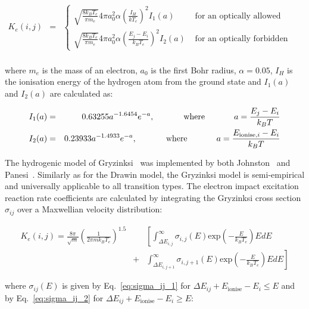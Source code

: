 \begin{eqnarray}
 K_e (i,j) &=& \left \lbrace \begin{array}{cc} \sqrt{ \frac{8 k_B T_e}{\pi m_e} } 4 \pi a_0^2 \alpha \left ( \frac{I_H}{k T_e} \right )^2 I_1 (a ) & \text{ for an optically allowed transition } \\ \sqrt{ \frac{8 k_B T_e}{\pi m_e} } 4 \pi a_0^2 \alpha \left ( \frac{E_j - E_i}{k_B T_e} \right )^2 I_2 (a ) & \text{ for an optically forbidden transition } \end{array} \right . \nonumber \\
 \label{eq:drawin_rates}
\end{eqnarray}
 
\noindent where $m_{e}$ is the mass of an electron, $a_{0}$ is the first Bohr radius, $\alpha = 0.05$, $I_H$ is the ionisation energy of the hydrogen atom from the ground state and $I_{1}(a)$ and $I_{2}(a)$ are calculated as:

\begin{eqnarray}
 I_1(a) &=& 0.63255 a^{-1.6454} e^{-a}, \text{ \hspace{1cm} where \hspace{1cm} } a = \frac{E_{j}-E_{i}}{k_B T} \\
 I_2(a) &=& 0.23933 a^{-1.4933} e^{-a}, \text{ \hspace{1cm} where \hspace{1cm} } a = \frac{E_{\text{ionise},i}-E_{i}}{k_B T}
\end{eqnarray}

The hydrogenic model of Gryzinksi~\cite{Gryz59} was implemented by both Johnston~\cite{JohnPhd} and Panesi~\cite{panesi_phd}.
Similarly as for the Drawin model, the Gryzinksi model is semi-empirical and universally applicable to all transition types.
The electron impact excitation reaction rate coefficients are calculated by integrating the Gryzinksi cross section $\sigma_{ij}$ over a Maxwellian velocity distribution:

\begin{eqnarray}
 K_{e} (i,j) = \frac{8\pi}{\sqrt{m}} \left ( \frac{1}{2\pi m k_B T_e} \right )^{1.5} && \left [ \int_{\Delta E_{i,j}}^{\infty} \sigma_{i,j} (E) \text{exp}\left ( - \frac{E}{k_B T_{e}} \right ) E dE \right . \nonumber \\
  &+& \left . \int_{\Delta E_{i,j+1}}^{\infty} \sigma_{i,j+1} (E) \text{exp}\left ( - \frac{E}{k_B T_{e}} \right ) E dE \right] 
\end{eqnarray}

\noindent where $\sigma_{ij}(E)$ is given by Eq.~\ref{eq:sigma_ij_1} for $\Delta E_{ij} + E_{\text{ionise}} - E_{i} \leq E$ and by Eq.~\ref{eq:sigma_ij_2} for $\Delta E_{ij} + E_{\text{ionise}} - E_{i} \geq E$:

